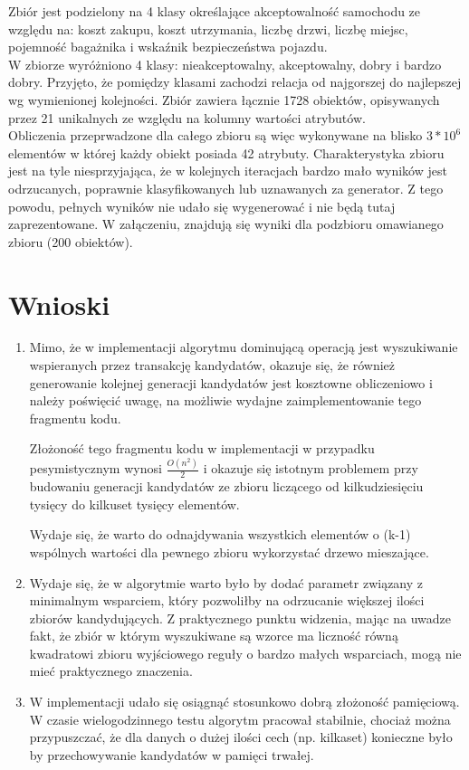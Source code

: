 \documentclass[a4paper,12pt]{article}
\begin{document}
Zbiór jest podzielony na 4 klasy określające akceptowalność samochodu ze względu na: koszt zakupu, koszt utrzymania, liczbę drzwi, liczbę miejsc, pojemność bagażnika i wskaźnik bezpieczeństwa pojazdu.\\

W zbiorze wyróżniono 4 klasy: nieakceptowalny, akceptowalny, dobry i bardzo dobry. Przyjęto, że pomiędzy klasami zachodzi relacja od najgorszej do najlepszej wg wymienionej kolejności. Zbiór zawiera łącznie 1728 obiektów, opisywanych przez 21 unikalnych ze względu na kolumny wartości atrybutów.\\

Obliczenia przeprwadzone dla całego zbioru są więc wykonywane na blisko $3*10^6$ elementów w której każdy obiekt posiada 42 atrybuty. Charakterystyka zbioru jest na tyle niesprzyjająca, że w kolejnych iteracjach bardzo mało wyników jest odrzucanych, poprawnie klasyfikowanych lub uznawanych za generator. Z tego powodu, pełnych wyników nie udało się wygenerować i nie będą tutaj zaprezentowane. W załączeniu, znajdują się wyniki dla podzbioru omawianego zbioru (200 obiektów).\\

\section{Wnioski}

\begin{enumerate}

\item Mimo, że w implementacji algorytmu dominującą operacją jest wyszukiwanie wspieranych przez transakcję kandydatów, okazuje się, że również generowanie kolejnej generacji kandydatów jest kosztowne obliczeniowo i należy poświęcić uwagę, na możliwie wydajne zaimplementowanie tego fragmentu kodu.

Złożoność tego fragmentu kodu w implementacji w przypadku pesymistycznym wynosi $\frac{O(n^2)}{2}$ i okazuje się istotnym problemem przy budowaniu generacji kandydatów ze zbioru liczącego od kilkudziesięciu tysięcy do kilkuset tysięcy elementów.

Wydaje się, że warto do odnajdywania wszystkich elementów o (k-1) wspólnych wartości dla pewnego zbioru wykorzystać drzewo mieszające.

\item Wydaje się, że w algorytmie warto było by dodać parametr związany z minimalnym wsparciem, który pozwoliłby na odrzucanie większej ilości zbiorów kandydujących. Z praktycznego punktu widzenia, mając na uwadze fakt, że zbiór w którym wyszukiwane są wzorce ma liczność równą kwadratowi zbioru wyjściowego reguły o bardzo małych wsparciach, mogą nie mieć praktycznego znaczenia.

\item W implementacji udało się osiągnąć stosunkowo dobrą złożoność pamięciową. W czasie wielogodzinnego testu algorytm pracował stabilnie, chociaż można przypuszczać, że dla danych o dużej ilości cech (np. kilkaset) konieczne było by przechowywanie kandydatów w pamięci trwałej.

\end{enumerate}
\end{document}
